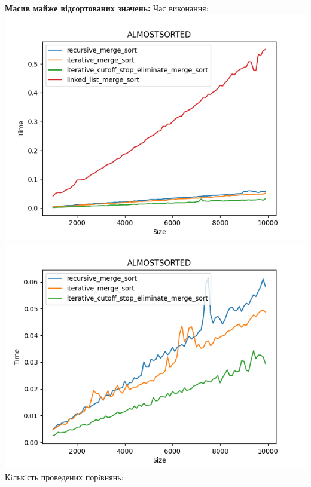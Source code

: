 \documentclass{article}
\begin{document}
        \newpage
        \textbf{Масив майже відсортованих значень:}
        \newline
        Час виконання:
        \newline
            \includegraphics[scale=0.5]{almostsorted_Time_4_sorts_90_numbers_50.png}
            \includegraphics[scale=0.5]{almostsorted_Time_3_sorts_90_numbers_50.png}
        \newline
        Кiлькiсть проведених порiвнянь:
        \newline
\end{document}
